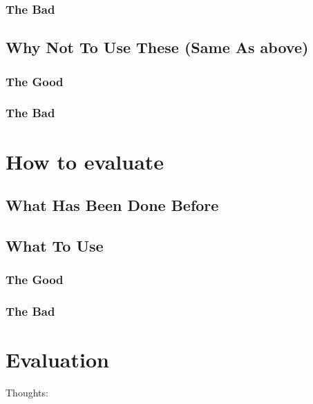 \subsubsection{The Bad}
\subsection{Why Not To Use These (Same As above)}
\subsubsection{The Good}
\subsubsection{The Bad}

\section{How to evaluate}
\subsection{What Has Been Done Before}
\subsection{What To Use}
\subsubsection{The Good}
\subsubsection{The Bad}

\section{Evaluation}



Thoughts:

